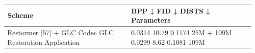 \begin{tabular}{ll}
\toprule
Scheme & BPP ↓ FID ↓ DISTS ↓ Parameters \\
\midrule
Restormer [57] + GLC Codec GLC Restoration Application & 0.0314 10.79 0.1174 25M + 109M 0.0299 8.62 0.1081 109M \\
\bottomrule
\end{tabular}
